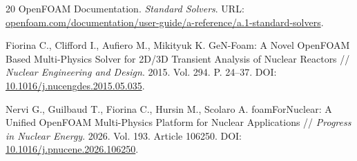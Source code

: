 \documentclass[12pt]{article}
\begin{document}
\begin{thebibliography}{20}
    OpenFOAM Documentation. \textit{Standard Solvers}. URL: \href{https://www.openfoam.com/documentation/user-guide/a-reference/a.1-standard-solvers}{openfoam.com/documentation/user-guide/a-reference/a.1-standard-solvers}.

    Fiorina C., Clifford I., Aufiero M., Mikityuk K. GeN-Foam: A Novel OpenFOAM Based Multi-Physics Solver for 2D/3D Transient Analysis of Nuclear Reactors // \textit{Nuclear Engineering and Design}. 2015. Vol. 294. P. 24--37. DOI: \href{https://doi.org/10.1016/j.nucengdes.2015.05.035}{10.1016/j.nucengdes.2015.05.035}.

    Nervi G., Guilbaud T., Fiorina C., Hursin M., Scolaro A. foamForNuclear: A Unified OpenFOAM Multi-Physics Platform for Nuclear Applications // \textit{Progress in Nuclear Energy}. 2026. Vol. 193. Article 106250. DOI: \href{https://doi.org/10.1016/j.pnucene.2026.106250}{10.1016/j.pnucene.2026.106250}.
\end{thebibliography}
\end{document}
